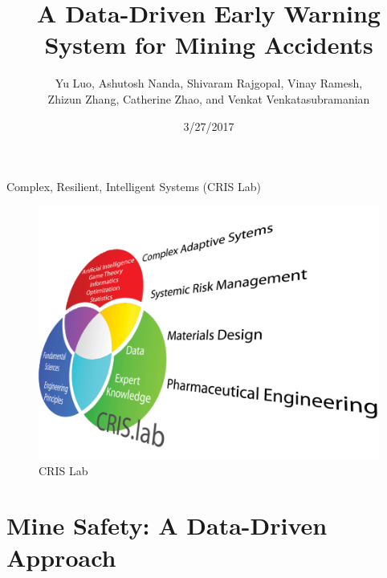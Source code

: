 \documentclass[]{beamer}
\title[Mining Accident Data Analysis]{A Data-Driven Early Warning System for Mining Accidents}
\author[Luo et al.]{Yu Luo, Ashutosh Nanda, Shivaram Rajgopal, Vinay Ramesh,\\
Zhizun Zhang, Catherine Zhao, and Venkat Venkatasubramanian}
\institute[Columbia University]{Chemical Engineering, Computer Science, and Business School\\
Columbia University}
\date{3/27/2017}
\begin{document}
\frame{\titlepage}

\begin{frame}
\tableofcontents[hideallsubsections]
\end{frame}

\begin{frame}{Complex, Resilient, Intelligent Systems (CRIS Lab)}

\begin{figure}[htbp]
\centering
\includegraphics{CrisResearch720.png}
\caption{CRIS Lab}
\end{figure}

\end{frame}

\section{Mine Safety: A Data-Driven
Approach}\label{mine-safety-a-data-driven-approach}


\end{document}
